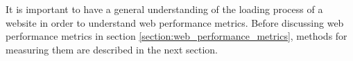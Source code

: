 It is important to have a general understanding of the loading process of a website in order to understand web performance metrics.
Before discussing web performance metrics in section \ref{section:web_performance_metrics}, methods for measuring them are described in the next section.








